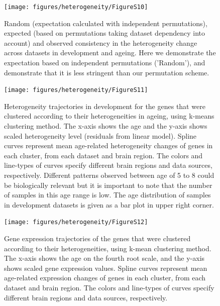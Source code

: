 \documentclass[12pt,twoside]{unicam}
\begin{document}
\begin{figure}

{\centering \texttt{[image: figures/heterogeneity/FigureS10]} 

}

\caption[Random, expected, and observed consistency in the heterogeneity change across datasets in development and ageing.]{Random (expectation calculated with independent permutations), expected (based on permutations taking dataset dependency into account) and observed consistency in the heterogeneity change across datasets in development and ageing. Here we demonstrate the expectation based on independent permutations ('Random'), and demonstrate that it is less stringent than our permutation scheme.}\label{fig:hetFigS10}
\end{figure}

\begin{figure}

{\centering \texttt{[image: figures/heterogeneity/FigureS11]} 

}

\caption[Heterogeneity trajectories in development for the genes that were clustered according to their heterogeneity levels in ageing.]{Heterogeneity trajectories in development for the genes that were clustered according to their heterogeneities in ageing, using k-means clustering method. The x-axis shows the age and the y-axis shows scaled heterogeneity level (residuals from linear model). Spline curves represent mean age-related heterogeneity changes of genes in each cluster, from each dataset and brain region. The colors and line-types of curves specify different brain regions and data sources, respectively. Different patterns observed between age of 5 to 8 could be biologically relevant but it is important to note that the number of samples in this age range is low. The age distribution of samples in development datasets is given as a bar plot in upper right corner.}\label{fig:hetFigS11}
\end{figure}

\begin{figure}

{\centering \texttt{[image: figures/heterogeneity/FigureS12]} 

}

\caption[Gene expression trajectories of the genes that were clustered according to their heterogeneity levels.]{Gene expression trajectories of the genes that were clustered according to their heterogeneities, using k-mean clustering method. The x-axis shows the age on the fourth root scale, and the y-axis shows scaled gene expression values. Spline curves represent mean age-related expression changes of genes in each cluster, from each dataset and brain region. The colors and line-types of curves specify different brain regions and data sources, respectively.}\label{fig:hetFigS12}
\end{figure}
\end{document}
